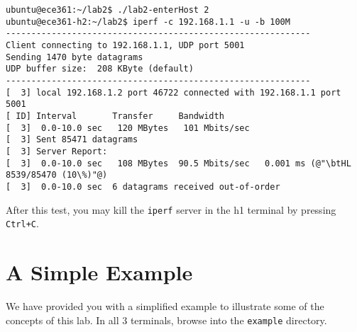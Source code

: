 \documentclass[11pt]{article}
\begin{document}
\begin{lstlisting}[style=ece361shell, caption={Running an \texttt{iperf} client in h2.}, label={lst:iperf-client}]
ubuntu@ece361:~/lab2$ ./lab2-enterHost 2
ubuntu@ece361-h2:~/lab2$ iperf -c 192.168.1.1 -u -b 100M
------------------------------------------------------------
Client connecting to 192.168.1.1, UDP port 5001
Sending 1470 byte datagrams
UDP buffer size:  208 KByte (default)
------------------------------------------------------------
[  3] local 192.168.1.2 port 46722 connected with 192.168.1.1 port 5001
[ ID] Interval       Transfer     Bandwidth
[  3]  0.0-10.0 sec   120 MBytes   101 Mbits/sec
[  3] Sent 85471 datagrams
[  3] Server Report:
[  3]  0.0-10.0 sec   108 MBytes  90.5 Mbits/sec   0.001 ms (@"\btHL 8539/85470 (10\%)"@)
[  3]  0.0-10.0 sec  6 datagrams received out-of-order
\end{lstlisting}

After this test, you may kill the \texttt{iperf} server in the h1 terminal by pressing \texttt{Ctrl+C}.


%
%

\section{A Simple Example}
\label{sec:example}

We have provided you with a simplified example to illustrate some of the concepts of this lab.
In all 3 terminals, browse into the \texttt{example} directory.
\end{document}
